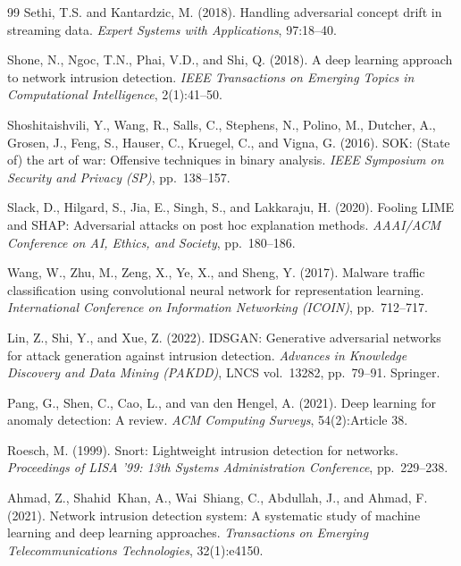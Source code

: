 \documentclass[12pt, letterpaper, oneside]{report}
\begin{document}
\begin{thebibliography}{99}
Sethi, T.S. and Kantardzic, M. (2018).
Handling adversarial concept drift in streaming data.
\textit{Expert Systems with Applications}, 97:18--40.

Shone, N., Ngoc, T.N., Phai, V.D., and Shi, Q. (2018).
A deep learning approach to network intrusion detection.
\textit{IEEE Transactions on Emerging Topics in Computational Intelligence}, 2(1):41--50.

Shoshitaishvili, Y., Wang, R., Salls, C., Stephens, N., Polino, M., Dutcher, A., Grosen, J., Feng, S., Hauser, C., Kruegel, C., and Vigna, G. (2016).
SOK: (State of) the art of war: Offensive techniques in binary analysis.
\textit{IEEE Symposium on Security and Privacy (SP)}, pp.\ 138--157.

Slack, D., Hilgard, S., Jia, E., Singh, S., and Lakkaraju, H. (2020).
Fooling LIME and SHAP: Adversarial attacks on post hoc explanation methods.
\textit{AAAI/ACM Conference on AI, Ethics, and Society}, pp.\ 180--186.

Wang, W., Zhu, M., Zeng, X., Ye, X., and Sheng, Y. (2017).
Malware traffic classification using convolutional neural network for representation learning.
\textit{International Conference on Information Networking (ICOIN)}, pp.\ 712--717.

Lin, Z., Shi, Y., and Xue, Z. (2022).
IDSGAN: Generative adversarial networks for attack generation against intrusion detection.
\textit{Advances in Knowledge Discovery and Data Mining (PAKDD)}, LNCS vol.\ 13282, pp.\ 79--91. Springer.

Pang, G., Shen, C., Cao, L., and van den Hengel, A. (2021).
Deep learning for anomaly detection: A review.
\textit{ACM Computing Surveys}, 54(2):Article 38.

Roesch, M. (1999).
Snort: Lightweight intrusion detection for networks.
\textit{Proceedings of LISA '99: 13th Systems Administration Conference}, pp.\ 229--238.

Ahmad, Z., Shahid~Khan, A., Wai~Shiang, C., Abdullah, J., and Ahmad, F. (2021).
Network intrusion detection system: A systematic study of machine learning and deep learning approaches.
\textit{Transactions on Emerging Telecommunications Technologies}, 32(1):e4150.


\end{thebibliography}
\end{document}
